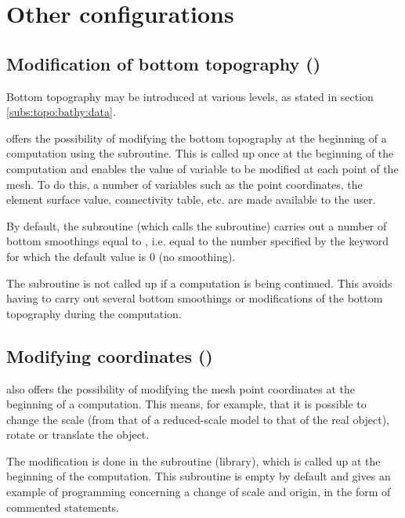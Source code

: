 \chapter{Other configurations}
\label{ch:oth:conf}

\section{Modification of bottom topography ()}
\label{sec:mod:bott:topo}
Bottom topography may be introduced at various levels, as stated
in section \ref{subs:topo:bathy:data}.

 offers the possibility of modifying the bottom topography
at the beginning of a computation using the  subroutine.
This is called up once at the beginning of the computation and enables the value
of variable  to be modified at each point of the mesh.
To do this, a number of variables such as the point coordinates, the element
surface value, connectivity table, etc. are made available to the user.

By default, the  subroutine (which calls the
 subroutine) carries out a number
of bottom smoothings equal to ,
i.e. equal to the number specified by the keyword 
for which the default value is 0 (no smoothing).

The  subroutine is not called up
if a computation is being continued.
This avoids having to carry out several bottom smoothings or modifications
of the bottom topography during the computation.


\section{Modifying coordinates ()}

 also offers the possibility of modifying the mesh point coordinates
at the beginning of a computation.
This means, for example, that it is possible to change the scale
(from that of a reduced-scale model to that of the real object),
rotate or translate the object.

The modification is done in the  subroutine
(\bief library), which is called up at the beginning of the computation.
This subroutine is empty by default and gives an example of programming
concerning a change of scale and origin, in the form of commented statements.

